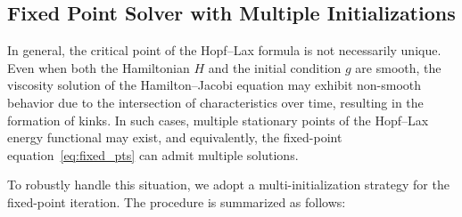 \documentclass[review,hidelinks,onefignum,onetabnum]{siamart250106}
\begin{document}





\subsection{Fixed Point Solver with Multiple Initializations}\label{sec:multi_initialization}
In general, the critical point of the Hopf--Lax formula is not necessarily unique. Even when both the Hamiltonian $H$ and the initial condition $g$ are smooth, the viscosity solution of the Hamilton--Jacobi equation may exhibit non-smooth behavior due to the intersection of characteristics over time, resulting in the formation of kinks. In such cases, multiple stationary points of the Hopf--Lax energy functional may exist, and equivalently, the fixed-point equation~\eqref{eq:fixed_pts} can admit multiple solutions. 

To robustly handle this situation, we adopt a multi-initialization strategy for the fixed-point iteration. The procedure is summarized as follows:
\end{document}
